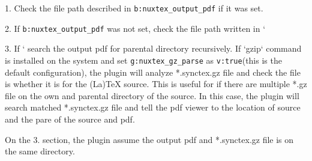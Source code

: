 1. Check the file path described in \verb|b:nuxtex_output_pdf| if it was set.

2. If \verb|b:nuxtex_output_pdf| was not set, check the file path written in
   `%

3. If `%
   search the output pdf for parental directory recursively.
   If `gzip` command is installed on the system and set \verb|g:nuxtex_gz_parse| as
   \verb|v:true|(this is the default configuration), the plugin will analyze
   *.synctex.gz file and check the file is whether it is for the (La)TeX source.
   This is useful for if there are multiple *.gz file on the own and parental directory of the source. In this case, the plugin will search matched *.synctex.gz file and tell the pdf viewer to the location of source and the pare of the source and pdf.

On the 3. section, the plugin assume the output pdf and *.synctex.gz file is on the same directory.

